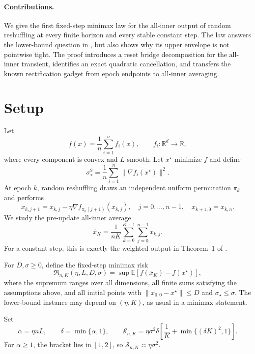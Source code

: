 \documentclass{article}
\theoremstyle{remark}
\newcommand{\E}{\mathbb E}
\newcommand{\R}{\mathbb R}
\newcommand{\Risk}{\mathfrak R}
\newcommand{\Stoch}{\mathcal S}
\newcommand{\1}{\mathbf 1}
\begin{document}
\paragraph{Contributions.}
We give the first fixed-step minimax law for the all-inner output of random reshuffling at every finite horizon and every stable constant step. The law answers the lower-bound question in \citet{liu2026dominates}, but also shows why its upper envelope is not pointwise tight. The proof introduces a reset bridge decomposition for the all-inner transient, identifies an exact quadratic cancellation, and transfers the known rectification gadget from epoch endpoints to all-inner averaging.

\section{Setup}

Let \[ f(x)=\frac1n\sum_{i=1}^n f_i(x), \qquad f_i:\R^d\to\R, \] where every component is convex and $L$-smooth. Let $x^\star$ minimize $f$ and define \[ \sigma_\star^2=\frac1n\sum_{i=1}^n \|\nabla f_i(x^\star)\|^2. \] At epoch $k$, random reshuffling draws an independent uniform permutation $\pi_k$ and performs
\begin{equation}
 x_{k,j+1}=x_{k,j}-\eta\nabla f_{\pi_k(j+1)}(x_{k,j}),
 \quad j=0,\ldots,n-1,
 \quad x_{k+1,0}=x_{k,n}.                 \label{eq:rr}
\end{equation}
We study the pre-update all-inner average
\begin{equation}
 \bar x_K=\frac1{nK}\sum_{k=0}^{K-1}\sum_{j=0}^{n-1}x_{k,j}.       \label{eq:average}
\end{equation}
For a constant step, this is exactly the weighted output in Theorem~1 of \citet{liu2026dominates}.

For $D,\sigma\geq0$, define the fixed-step minimax risk
\begin{equation}
 \Risk_{n,K}(\eta,L,D,\sigma)
 =\sup \E[f(\bar x_K)-f(x^\star)],                       \label{eq:risk}
\end{equation}
where the supremum ranges over all dimensions, all finite sums satisfying the assumptions above, and all initial points with $\|x_{0,0}-x^\star\|\leq D$ and $\sigma_\star\leq\sigma$. The lower-bound instance may depend on $(\eta,K)$, as usual in a minimax statement.

Set
\begin{equation}
 \alpha=\eta nL,
 \qquad \delta=\min\{\alpha,1\},
 \qquad
 \Stoch_{n,K}=\eta\sigma^2\delta
 \left[\frac1K+\min\{(\delta K)^2,1\}\right].            \label{eq:S}
\end{equation}
For $\alpha\geq1$, the bracket lies in $[1,2]$, so $\Stoch_{n,K}\asymp\eta\sigma^2$.
\end{document}
